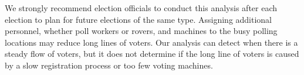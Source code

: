 We strongly recommend election officials to conduct this analysis after each election to plan for future elections of the same type. Assigning additional personnel, whether poll workers or rovers, and machines to the busy polling locations may reduce long lines of voters.  Our analysis can detect when there is a steady flow of voters, but it does not determine if the long line of voters is caused by a slow registration process or too few voting machines.
